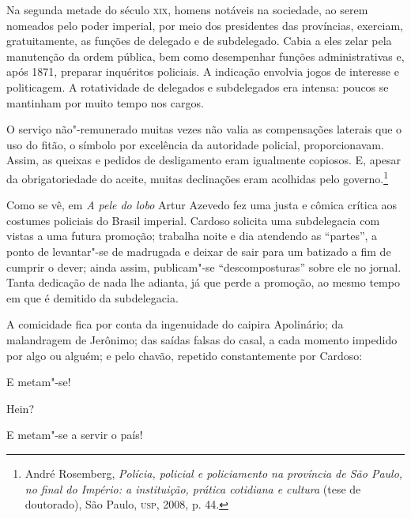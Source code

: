 Na segunda metade do século \textsc{xix}, homens notáveis na sociedade, ao serem
nomeados pelo poder imperial, por meio dos presidentes das províncias,
exerciam, gratuitamente, as funções de delegado e de subdelegado. Cabia
a eles zelar pela manutenção da ordem pública, bem como desempenhar
funções administrativas e, após 1871, preparar inquéritos policiais. A
indicação envolvia jogos de interesse e politicagem. A rotatividade de
delegados e subdelegados era intensa: poucos se mantinham por muito
tempo nos cargos. 

\begin{hedraquote} 
O serviço não"-remunerado muitas vezes não valia as compensações laterais
que o uso do fitão, o símbolo por excelência da autoridade policial,
proporcionavam. Assim, as queixas e pedidos de desligamento eram
igualmente copiosos. E, apesar da obrigatoriedade do aceite, muitas
declinações eram acolhidas pelo governo.\footnote{ André Rosemberg,
\textit{Polícia, policial e policiamento na província de São Paulo, no
final do Império: a instituição, prática cotidiana e cultura} (tese de
doutorado), São Paulo, \textsc{usp}, 2008, p. 44.}  
\end{hedraquote} 

Como se vê, em \textit{A pele do lobo} Artur Azevedo fez uma justa e
cômica crítica aos costumes policiais do Brasil imperial. Cardoso
solicita uma subdelegacia com vistas a uma futura promoção; trabalha
noite e dia atendendo as “partes”, a ponto de levantar"-se de madrugada
e deixar de sair para um batizado a fim de cumprir o dever; ainda
assim, publicam"-se “descomposturas” sobre ele no jornal. Tanta
dedicação de nada lhe adianta, já que perde a promoção, ao mesmo tempo
em que é demitido da subdelegacia.

A comicidade fica por conta da ingenuidade do caipira Apolinário; da
malandragem de Jerônimo; das saídas falsas do casal, a cada momento
impedido por algo ou alguém; e pelo chavão, repetido constantemente por
Cardoso:

\pagebreak

\begin{hedraquote}
 E metam"-se!

 Hein?

 E metam"-se a servir o país!
\end{hedraquote}


